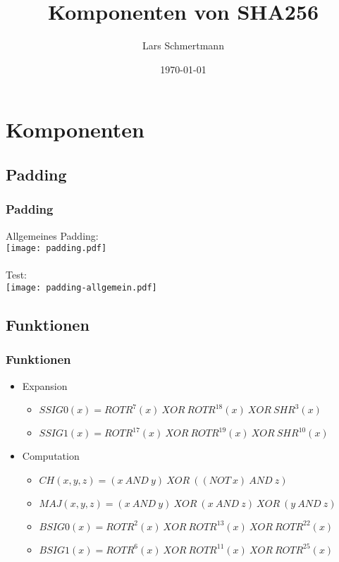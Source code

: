 \documentclass{beamer}
\title{Komponenten von SHA256}
\author{Lars Schmertmann}
\date{\today}
\begin{document}
\maketitle
\frame{\tableofcontents[currentsection]}
 
\section{Komponenten}
\subsection{Padding}
  \begin{frame}
    \frametitle{Padding}
    Allgemeines Padding:\\
    \texttt{[image: padding.pdf]}\\
    \pause~\\
    Test:\\
    \texttt{[image: padding-allgemein.pdf]}
  \end{frame}
\subsection{Funktionen}
  \begin{frame}
    \frametitle{Funktionen}
    \begin{itemize}
      \setlength{\itemsep}{20pt}
      \item Expansion
        \begin{itemize}
          \setlength{\itemsep}{10pt}
          \item $ SSIG0(x) = ROTR^{7}(x)~XOR~ROTR^{18}(x)~XOR~SHR^{3}(x) $
          \item $ SSIG1(x) = ROTR^{17}(x)~XOR~ROTR^{19}(x)~XOR~SHR^{10}(x) $
        \end{itemize}
      \item Computation
        \begin{itemize}
          \setlength{\itemsep}{10pt}
          \item $ CH( x, y, z) = (x~AND~y)~XOR~( (NOT~x)~AND~z) $
          \item $ MAJ( x, y, z) = (x~AND~y)~XOR~(x~AND~z)~XOR~(y~AND~z) $
          \item $ BSIG0(x) = ROTR^{2}(x)~XOR~ROTR^{13}(x)~XOR~ROTR^{22}(x) $
          \item $ BSIG1(x) = ROTR^{6}(x)~XOR~ROTR^{11}(x)~XOR~ROTR^{25}(x) $
        \end{itemize}
    \end{itemize}
  \end{frame}
\end{document}
